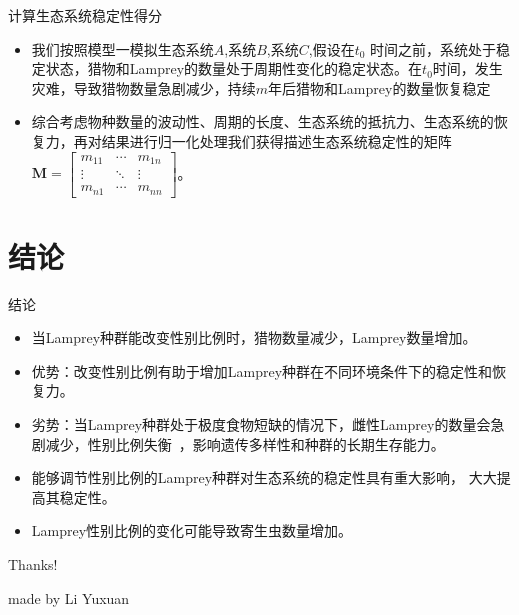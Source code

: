\documentclass{beamer}
\begin{document}
\begin{frame}{计算生态系统稳定性得分}
\begin{itemize}
    \item 我们按照模型一模拟生态系统$A$,系统$B$,系统$C$,假设在$t_0$ 时间之前，系统处于稳定状态，猎物和Lamprey的数量处于周期性变化的稳定状态。在$t_0$时间，发生灾难，导致猎物数量急剧减少，持续$m$年后猎物和Lamprey的数量恢复稳定
    \item 综合考虑物种数量的波动性、周期的长度、生态系统的抵抗力、生态系统的恢复力，再对结果进行归一化处理我们获得描述生态系统稳定性的矩阵
    $\mathbf{M} = \begin{bmatrix}
        m_{11} & \cdots & m_{1n} \\
        \vdots & \ddots & \vdots \\
        m_{n1} & \cdots & m_{nn}
    \end{bmatrix}$。

\end{itemize}
    

\end{frame}


\section{结论}
\begin{frame}{结论}
\begin{itemize}
    \item 当Lamprey种群能改变性别比例时，猎物数量减少，Lamprey数量增加。
    \item 优势：改变性别比例有助于增加Lamprey种群在不同环境条件下的稳定性和恢复力。
    \item 劣势：当Lamprey种群处于极度食物短缺的情况下，雌性Lamprey的数量会急剧减少，性别比例失衡 ，影响遗传多样性和种群的长期生存能力。
    \item 能够调节性别比例的Lamprey种群对生态系统的稳定性具有重大影响， 大大提高其稳定性。 
    \item Lamprey性别比例的变化可能导致寄生虫数量增加。
    
\end{itemize}

\end{frame}



\begin{frame}
\begin{center}
	{\Huge\calligra Thanks!}
\end{center}
\hspace*{\fill}
\hspace*{\fill}
\hspace*{\fill}
\hspace*{\fill}
\hspace*{\fill}
\hspace*{\fill}
\hspace*{\fill}
\hspace*{\fill}
\hspace*{\fill}
\hspace*{\fill}
{\small\calligra made by Li Yuxuan}
\end{frame}
\end{document}
